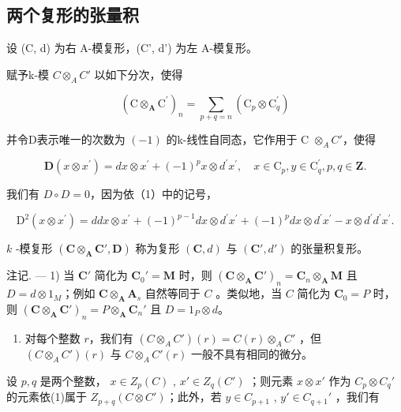 \subsection{两个复形的张量积}

设 (C, d) 为右 A-模复形，(C', d') 为左 A-模复形。

赋予k-模 \(C \otimes_{A} C'\) 以如下分次，使得

\[
(\mathrm{C} \otimes_ {\mathbf {A}} \mathrm{C} ^ {\prime}) _ {n} = \sum_ {p + q = n} (\mathrm{C} _ {p} \otimes \mathrm{C} _ {q} ^ {\prime})
\]

并令D表示唯一的次数为 \((-1)\) 的k-线性自同态，它作用于 C \(\otimes_{A} C'\)，使得

\[
\mathbf {D} (x \otimes x ^ {\prime}) = d x \otimes x ^ {\prime} + (- 1) ^ {p} x \otimes d ^ {\prime} x ^ {\prime}, \quad x \in \mathrm{C} _ {p}, y \in \mathrm{C} _ {q} ^ {\prime}, p, q \in \mathbf {Z}. \tag {1}
\]

我们有 \(D \circ D = 0\)，因为依（1）中的记号，

\[
\mathrm{D} ^ {2} (x \otimes x ^ {\prime}) = d d x \otimes x ^ {\prime} + (- 1) ^ {p - 1} d x \otimes d ^ {\prime} x ^ {\prime} + (- 1) ^ {p} d x \otimes d ^ {\prime} x ^ {\prime} - x \otimes d ^ {\prime} d ^ {\prime} x ^ {\prime}.
\]

\(k\) -模复形 \((\mathbf{C} \otimes_{\mathbf{A}} \mathbf{C}', \mathbf{D})\) 称为复形 \((\mathbf{C}, d)\) 与 \((\mathbf{C}', d')\) 的张量积复形。

注记. --- 1) 当 \(\mathbf{C}'\) 简化为 \(\mathbf{C}_0' = \mathbf{M}\) 时，则 \((\mathbf{C} \otimes_{\mathbf{A}} \mathbf{C}')_n = \mathbf{C}_n \otimes_{\mathbf{A}} \mathbf{M}\) 且 \(D = d \otimes 1_M\)；例如 \(\mathbf{C} \otimes_{\mathbf{A}} \mathbf{A}_s\) 自然等同于 \(C\) 。类似地，当 \(C\) 简化为 \(\mathbf{C}_0 = P\) 时，则 \((\mathbf{C} \otimes_{\mathbf{A}} \mathbf{C}')_n = P \otimes_{\mathbf{A}} \mathbf{C}_n'\) 且 \(D = 1_P \otimes d\)。

\begin{enumerate}
\def\labelenumi{\arabic{enumi})}
\setcounter{enumi}{1}
\tightlist
\item
  对每个整数 \(r\)，我们有 \((C \otimes_{A} C')(r) = C(r) \otimes_{A} C'\) ，但 \((C \otimes_{A} C')(r)\) 与 \(C \otimes_{A} C'(r)\) 一般不具有相同的微分。
\end{enumerate}

设 \(p, q\) 是两个整数， \(x \in Z_p(C)\) , \(x' \in Z_q(C')\) ；则元素 \(x \otimes x'\) 作为 \(C_p \otimes C_q'\) 的元素依(1)属于 \(Z_{p+q}(C \otimes C')\)；此外，若 \(y \in C_{p+1}\) , \(y' \in C_{q+1}'\) ，我们有

